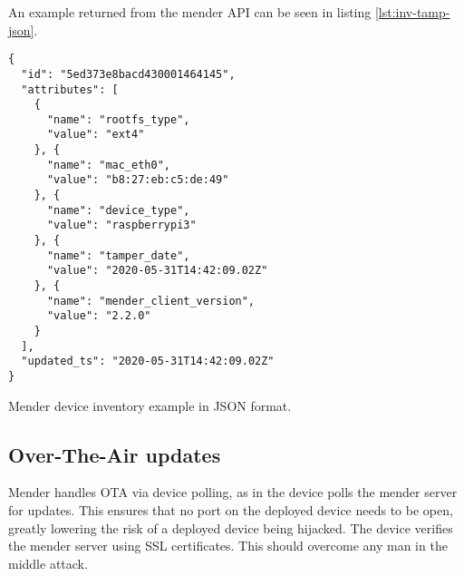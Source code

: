 \documentclass[../../main.tex]{subfiles}
\begin{document}
An example returned from the mender API can be seen in listing \ref{lst:inv-tamp-json}.

\begin{listing}
\begin{verbatim}
{
  "id": "5ed373e8bacd430001464145",
  "attributes": [
    {
      "name": "rootfs_type",
      "value": "ext4"
    }, {
      "name": "mac_eth0",
      "value": "b8:27:eb:c5:de:49"
    }, {
      "name": "device_type",
      "value": "raspberrypi3"
    }, {
      "name": "tamper_date",
      "value": "2020-05-31T14:42:09.02Z"
    }, {
      "name": "mender_client_version",
      "value": "2.2.0"
    }
  ],
  "updated_ts": "2020-05-31T14:42:09.02Z"
}

\end{verbatim}
\caption{Mender device inventory example in JSON format.}
\label{lst:inv-tamp-json}
\end{listing}



\subsection{Over-The-Air updates}%
\label{sub:over_the_air_updates}

Mender handles OTA via device polling, as in the device polls the mender server for updates.
This ensures that no port on the deployed device needs to be open, greatly lowering the risk of
a deployed device being hijacked.
The device verifies the mender server using SSL certificates.
This should overcome any man in the middle attack.




%
%
%
%
	
\end{document}
